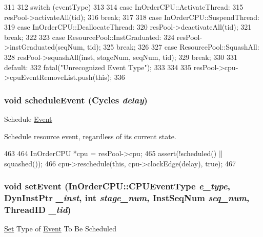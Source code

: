 \begin{DoxyCode}
311 {
312     switch (eventType)
313     {
314       case InOrderCPU::ActivateThread:
315         resPool->activateAll(tid);
316         break;
317 
318       case InOrderCPU::SuspendThread:
319       case InOrderCPU::DeallocateThread:
320         resPool->deactivateAll(tid);
321         break;
322 
323       case ResourcePool::InstGraduated:
324         resPool->instGraduated(seqNum, tid);
325         break;
326 
327       case ResourcePool::SquashAll:
328         resPool->squashAll(inst, stageNum, seqNum, tid);
329         break;
330 
331       default:
332         fatal("Unrecognized Event Type");
333     }
334 
335     resPool->cpu->cpuEventRemoveList.push(this);
336 }
\end{DoxyCode}
\hypertarget{classResourcePool_1_1ResPoolEvent_af53dcbdc9da1cc615d43ff3bd2b4162c}{
\subsubsection[{scheduleEvent}]{\setlength{\rightskip}{0pt plus 5cm}void scheduleEvent ({\bf Cycles} {\em delay})}}
\label{classResourcePool_1_1ResPoolEvent_af53dcbdc9da1cc615d43ff3bd2b4162c}
Schedule \hyperlink{classEvent}{Event}

Schedule resource event, regardless of its current state. 


\begin{DoxyCode}
463 {
464     InOrderCPU *cpu = resPool->cpu;
465     assert(!scheduled() || squashed());
466     cpu->reschedule(this, cpu->clockEdge(delay), true);
467 }
\end{DoxyCode}
\hypertarget{classResourcePool_1_1ResPoolEvent_a36b67a6174c65a497582c7e62161d709}{
\subsubsection[{setEvent}]{\setlength{\rightskip}{0pt plus 5cm}void setEvent ({\bf InOrderCPU::CPUEventType} {\em e\_\-type}, \/  {\bf DynInstPtr} {\em \_\-inst}, \/  int {\em stage\_\-num}, \/  {\bf InstSeqNum} {\em seq\_\-num}, \/  {\bf ThreadID} {\em \_\-tid})}}
\label{classResourcePool_1_1ResPoolEvent_a36b67a6174c65a497582c7e62161d709}
\hyperlink{classSet}{Set} Type of \hyperlink{classEvent}{Event} To Be Scheduled 


